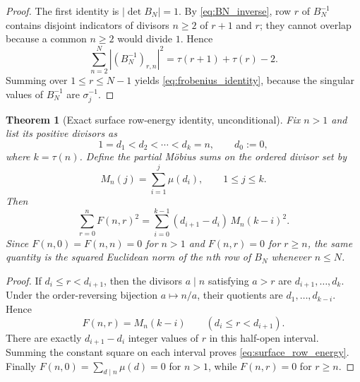 \documentclass[11pt]{amsart}
\numberwithin{equation}{section}
\theoremstyle{plain}
\newtheorem{theorem}{Theorem}[section]
\theoremstyle{definition}
\theoremstyle{remark}
\newcommand{\mob}{\mu}
\newcommand{\Fsurf}{F}
\begin{document}
\begin{proof}
The first identity is $|\det B_N|=1$.  By \eqref{eq:BN_inverse}, row $r$ of $B_N^{-1}$ contains disjoint indicators of divisors $n\ge2$ of $r+1$ and $r$; they cannot overlap because a common $n\ge2$ would divide $1$.  Hence
\begin{equation}
\sum_{n=2}^{N}|(B_N^{-1})_{r,n}|^2
=\tau(r+1)+\tau(r)-2.
\label{eq:inverse_row_norm}
\end{equation}
Summing over $1\le r\le N-1$ yields \eqref{eq:frobenius_identity}, because the singular values of $B_N^{-1}$ are $\sigma_j^{-1}$.
\end{proof}

\begin{theorem}[Exact surface row-energy identity, unconditional]
\label{thm:surface_row_energy}
Fix $n>1$ and list its positive divisors as
\begin{equation}
1=d_1<d_2<\cdots<d_k=n,
\qquad d_0:=0,
\label{eq:ordered_divisors_row}
\end{equation}
where $k=\tau(n)$.  Define the partial Möbius sums on the ordered divisor set by
\begin{equation}
M_n(j)=\sum_{i=1}^{j}\mob(d_i),
\qquad 1\le j\le k.
\label{eq:Mn_divisor_partial}
\end{equation}
Then
\begin{equation}
\sum_{r=0}^{n}\Fsurf(n,r)^2
=\sum_{i=0}^{k-1}(d_{i+1}-d_i)\,M_n(k-i)^2.
\label{eq:surface_row_energy}
\end{equation}
Since $\Fsurf(n,0)=\Fsurf(n,n)=0$ for $n>1$ and $\Fsurf(n,r)=0$ for $r\ge n$, the same quantity is the squared Euclidean norm of the $n$th row of $B_N$ whenever $n\le N$.
\end{theorem}

\begin{proof}
If $d_i\le r<d_{i+1}$, then the divisors $a\mid n$ satisfying $a>r$ are $d_{i+1},\ldots,d_k$.  Under the order-reversing bijection $a\mapsto n/a$, their quotients are $d_1,\ldots,d_{k-i}$.  Hence
\begin{equation}
\Fsurf(n,r)=M_n(k-i)
\qquad(d_i\le r<d_{i+1}).
\label{eq:F_piecewise_Mn}
\end{equation}
There are exactly $d_{i+1}-d_i$ integer values of $r$ in this half-open interval.  Summing the constant square on each interval proves \eqref{eq:surface_row_energy}.  Finally $\Fsurf(n,0)=\sum_{d\mid n}\mob(d)=0$ for $n>1$, while $\Fsurf(n,r)=0$ for $r\ge n$.
\end{proof}
\end{document}
